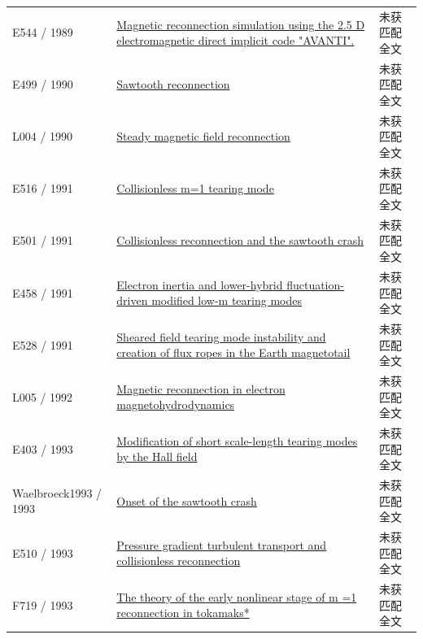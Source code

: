 \begin{longtable}{P{24mm}P{97mm}P{27mm}}
E544 / 1989 & \href{https://ui.adsabs.harvard.edu/abs/1989ESASP.285...55H/abstract}{Magnetic reconnection simulation using the 2.5 D electromagnetic direct implicit code "AVANTI".} & 未获匹配全文\\

E499 / 1990 & \href{https://doi.org/10.1088/0029-5515/30/12/008}{Sawtooth reconnection} & 未获匹配全文\\

L004 / 1990 & \href{https://doi.org/10.1029/gm058p0063}{Steady magnetic field reconnection} & 未获匹配全文\\

E516 / 1991 & \href{https://doi.org/10.1103/physrevlett.66.425}{Collisionless m=1 tearing mode} & 未获匹配全文\\

E501 / 1991 & \href{https://doi.org/10.1103/physrevlett.66.1458}{Collisionless reconnection and the sawtooth crash} & 未获匹配全文\\

E458 / 1991 & \href{https://doi.org/10.1063/1.859804}{Electron inertia and lower-hybrid fluctuation-driven modified low-m tearing modes} & 未获匹配全文\\

E528 / 1991 & \href{https://doi.org/10.1029/91gl00235}{Sheared field tearing mode instability and creation of flux ropes in the Earth magnetotail} & 未获匹配全文\\

L005 / 1992 & \href{https://doi.org/10.1063/1.860467}{Magnetic reconnection in electron magnetohydrodynamics} & 未获匹配全文\\

E403 / 1993 & \href{https://doi.org/10.1063/1.860880}{Modification of short scale-length tearing modes by the Hall field} & 未获匹配全文\\

Waelbroeck1993 / 1993 & \href{https://doi.org/10.1103/physrevlett.70.3259}{Onset of the sawtooth crash} & 未获匹配全文\\

E510 / 1993 & \href{https://doi.org/10.1088/0741-3335/35/6/009}{Pressure gradient turbulent transport and collisionless reconnection} & 未获匹配全文\\

F719 / 1993 & \href{https://doi.org/10.1063/1.860735}{The theory of the early nonlinear stage of m =1 reconnection in tokamaks*} & 未获匹配全文\\


\end{longtable}
